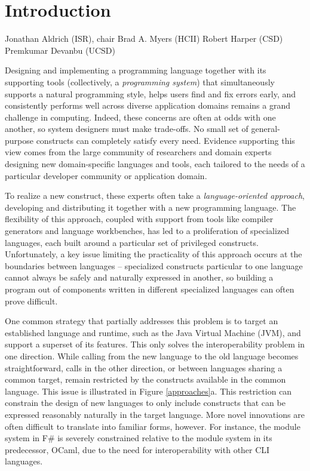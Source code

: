 \section{Introduction}

Jonathan Aldrich (ISR), chair
Brad A. Myers (HCII)
Robert Harper (CSD)
Premkumar Devanbu (UCSD)

Designing and implementing a programming language together with its supporting tools (collectively, a \emph{programming system}) that simultaneously supports a natural programming style, helps users find and fix errors early, and consistently performs well across diverse application domains remains a grand challenge in computing. Indeed, these concerns are often at odds with one another, so system designers must make trade-offs. No small set of general-purpose constructs can completely satisfy every need. Evidence supporting this view comes from the large community of researchers and domain experts designing new domain-specific languages and tools, each tailored to the needs of a particular developer community or application domain.

To realize a new construct, these experts often take a \emph{language-oriented approach}, developing and distributing it together with a new programming language. The flexibility of this approach, coupled with support from tools like compiler generators and language workbenches, has led to a proliferation of specialized languages, each built around a particular set of privileged constructs. Unfortunately, a key issue limiting the practicality of this approach occurs at the boundaries between languages -- specialized constructs particular to one language cannot always be safely and naturally expressed in another, so building a program out of components written in different specialized languages can often prove difficult. 

One common strategy that partially addresses this problem is to target an established language and runtime, such as the Java Virtual Machine (JVM), and support a superset of its features. This only solves the interoperability problem in one direction. While calling from the new language to the old language becomes straightforward, calls in the other direction, or between languages sharing a common target, remain restricted by the constructs available in the common language. This issue is illustrated in Figure \ref{approaches}a. This restriction can  constrain the design of new languages to only include constructs that can be expressed reasonably naturally in the target language. More novel innovations are often difficult to translate into familiar forms, however. For instance, the module system in F\# is severely constrained relative to the module system in its predecessor, OCaml, due to the need for interoperability with other CLI languages.

